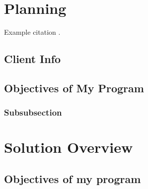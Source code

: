 \documentclass[12pt]{article} %
\begin{document}
\tableofcontents %

\newpage %


\section{Planning} %

Example citation \cite{Figueredo:2009dg}.


\subsection{Client Info} %




\subsection{Objectives of My Program} %




\subsubsection{Subsubsection } %


\vfill

\section{Solution Overview} %


\subsection{Objectives of my program} %
\end{document}
